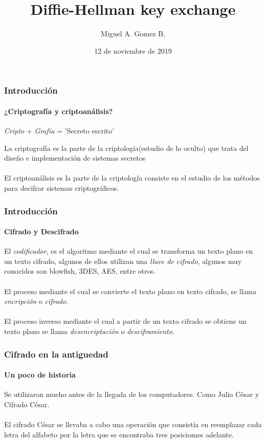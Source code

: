\documentclass[spanish, mexico]{beamer}
\title[Diffie-Hellman key exchange, ¿Cómo y porqué funciona?]{Diffie-Hellman key exchange}
\author{Miguel A. Gomez B.}
\institute[FUKL]
{
	Fundación Universitaria Konrad Lorenz\\ 
	\medskip 
	\textit{miguela.gomezb@konradlorenz.edu.co}
}
\date{12 de noviembre de 2019}
\begin{document}
	\begin{frame}
	\titlepage 
	\end{frame}

	\begin{frame}
		\frametitle{Introducción}
		\framesubtitle{¿Criptografía y criptoanálisis?}
		\begin{center}
			\textit{Cripto} + \textit{Grafía} = 'Secreto escrito' 
		\end{center}
		La criptografía es la parte de la criptología(estudio de lo oculto) que trata del diseño e implementación de sistemas secretos \cite{Tnumeros2004}\\~\\
		El criptoanálisis es la parte de la criptología consiste en el estudio de los métodos para decifrar sistemas criptográficos.
	\end{frame}

	\begin{frame}
		\frametitle{Introducción}
		\framesubtitle{Cifrado y Descifrado}
		El \textit{codificador}, es el algoritmo mediante el cual se transforma un texto plano en un texto cifrado, algunos de ellos utilizan una \textit{llave de cifrado}, algunos muy conocidos son blowfish, 3DES, AES, entre otros.\\~\\
		El proceso mediante el cual se convierte el texto plano en texto cifrado, se llama \textit{encripción} o \textit{cifrado}.\\~\\
		El proceso inverso mediante el cual a partir de un texto cifrado se obtiene un texto plano se llama \textit{desencriptación} o \textit{desciframiento}.
	\end{frame}

	\begin{frame}
		\frametitle{Cifrado en la antiguedad}
		\framesubtitle{Un poco de historia}
		Se utilizaron mucho antes de la llegada de los computadores. Como Julio César y Cifrado César.\\~\\
		El cifrado César se llevaba a cabo una operación que consistía en reemplazar cada letra del alfabeto por la letra que se encontraba tres posiciomes adelante.
	\end{frame}
\end{document}
